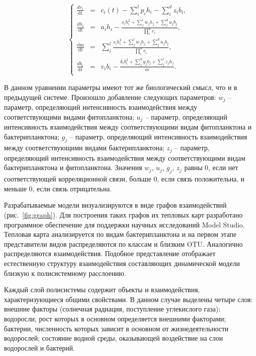 \documentclass[a4paper,12pt,openany,final]{extreport}
\begin{document}
\begin{equation}
 \left\{ \begin{array}{lcl}
\frac{dr_{i}}{\text{dt}} &=& c_{i}\left( t \right) - \sum_{i}^{l}{p_{i}h_{i}} - \sum_{i}^{d}{z_{i}b_{i}},\\
\frac{dh_{i}}{\text{dt}} &=& a_{i}h_{i} - \frac{s_{i}h_{i}^{2} + \sum_{j}^{l}{w_{j}h_{j} + \sum_{j}^{d}{u_{j}b_{j}}}}{\prod_{i}^{n}r_{i}},\\
\frac{\text{dm}}{\text{dt}} &=& \sum_{i}^{l}\frac{s_{i}h_{i}^{2} + \sum_{j}^{l}{w_{j}h_{j} + \sum_{j}^{d}{u_{j}b_{j}}}}{\prod_{i}^{n}r_{i}},\\
\frac{db_{i}}{\text{dt}} &=& v_{i}b_{i} - \frac{k_{i}b_{i}^{2} + \sum_{j}^{d}{g_{j}b_{j} + \sum_{j}^{l}{z_{j}h_{j}}}}{m}.\\
\end{array} \right.
  \label{eq:four-comp-sys-spec}
\end{equation}

В данном уравнении параметры имеют тот же биологический смысл, что и в
предыдущей системе. Произошло добавление следующих параметров: \(w_{j}\)
-- параметр, определяющий интенсивность взаимодействия между
соответствующими видами фитопланктона; \(u_{j}\) -- параметр,
определяющий интенсивность взаимодействия между соответствующими видам
фитопланктона и бактерипланктона; \(g_{j}\) -- параметр, определяющий
интенсивность взаимодействия между соответствующими видами
бактерипланктона; \(z_{j}\) -- параметр, определяющий интенсивность
взаимодействия между соответствующими видам бактерипланктона и
фитопланктона. Значения \(w_{j}\), \(u_{j}\), \(g_{j}\), \(z_{j}\) равны 0, если
нет соответствующей корреляционной связи, больше 0, если связь
положительна, и меньше 0, если связь отрицательна.

Разрабатываемые модели визуализируются в виде графов взаимодействий
(рис.~\ref{fig:graph}). Для построения таких графов их тепловых карт разработано
программное обеспечение для поддержки научных исследований Model Studio.
Тепловая карта анализируется по видам бактерипланктона и на первом этапе
представители видов распределяются по классам и близким OTU. Аналогично
распределяются взаимодействия. Подобное представление отображает
естественную структуру взаимодействия составляющих динамической модели
близкую к полисистемному расслоению.

Каждый слой полисистемы содержит объекты и взаимодействия,
характеризующиеся общими свойствами. В данном случае выделены четыре
слоя: внешние факторы (солнечная радиация, поступление углекислого
газа): водоросли, рост которых в основном определяется внешними
факторами; бактерии, численность которых зависит в основном от
жизнедеятельности водорослей; состояние водной среды, оказывающей
воздействие на слои водорослей и бактерий.
\end{document}
